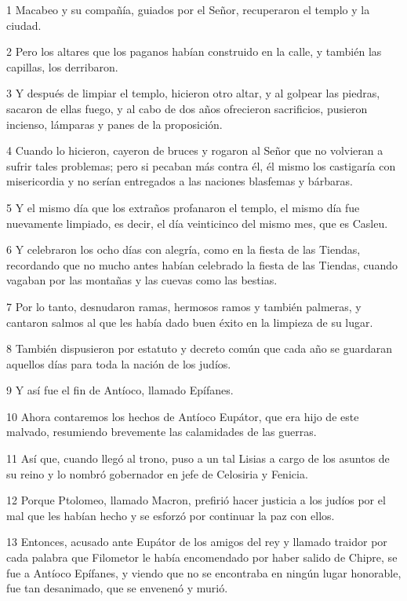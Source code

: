 \par 1 Macabeo y su compañía, guiados por el Señor, recuperaron el templo y la ciudad.
\par 2 Pero los altares que los paganos habían construido en la calle, y también las capillas, los derribaron.
\par 3 Y después de limpiar el templo, hicieron otro altar, y al golpear las piedras, sacaron de ellas fuego, y al cabo de dos años ofrecieron sacrificios, pusieron incienso, lámparas y panes de la proposición.
\par 4 Cuando lo hicieron, cayeron de bruces y rogaron al Señor que no volvieran a sufrir tales problemas; pero si pecaban más contra él, él mismo los castigaría con misericordia y no serían entregados a las naciones blasfemas y bárbaras.
\par 5 Y el mismo día que los extraños profanaron el templo, el mismo día fue nuevamente limpiado, es decir, el día veinticinco del mismo mes, que es Casleu.
\par 6 Y celebraron los ocho días con alegría, como en la fiesta de las Tiendas, recordando que no mucho antes habían celebrado la fiesta de las Tiendas, cuando vagaban por las montañas y las cuevas como las bestias.
\par 7 Por lo tanto, desnudaron ramas, hermosos ramos y también palmeras, y cantaron salmos al que les había dado buen éxito en la limpieza de su lugar.
\par 8 También dispusieron por estatuto y decreto común que cada año se guardaran aquellos días para toda la nación de los judíos.
\par 9 Y así fue el fin de Antíoco, llamado Epífanes.
\par 10 Ahora contaremos los hechos de Antíoco Eupátor, que era hijo de este malvado, resumiendo brevemente las calamidades de las guerras.
\par 11 Así que, cuando llegó al trono, puso a un tal Lisias a cargo de los asuntos de su reino y lo nombró gobernador en jefe de Celosiria y Fenicia.
\par 12 Porque Ptolomeo, llamado Macron, prefirió hacer justicia a los judíos por el mal que les habían hecho y se esforzó por continuar la paz con ellos.
\par 13 Entonces, acusado ante Eupátor de los amigos del rey y llamado traidor por cada palabra que Filometor le había encomendado por haber salido de Chipre, se fue a Antíoco Epífanes, y viendo que no se encontraba en ningún lugar honorable, fue tan desanimado, que se envenenó y murió.
